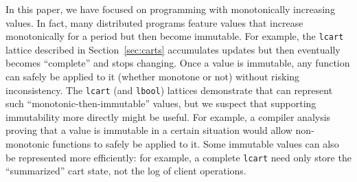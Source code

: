 In this paper, we have focused on programming with monotonically increasing
values. In fact, many distributed programs feature values that increase
monotonically for a period but then become immutable. For example, the
\texttt{lcart} lattice described in Section~\ref{sec:carts} accumulates updates
but then eventually becomes ``complete'' and stops changing. Once a value is
immutable, any function can safely be applied to it (whether monotone or not)
without risking inconsistency. The \texttt{lcart} (and \texttt{lbool}) lattices
demonstrate that \lang can represent such ``monotonic-then-immutable'' values,
but we suspect that supporting immutability more directly might be useful. For
example, a compiler analysis proving that a value is immutable in a certain
situation would allow non-monotonic functions to safely be applied to it. Some
immutable values can also be represented more efficiently: for example, a
complete \texttt{lcart} need only store the ``summarized'' cart state, not the
log of client operations.






